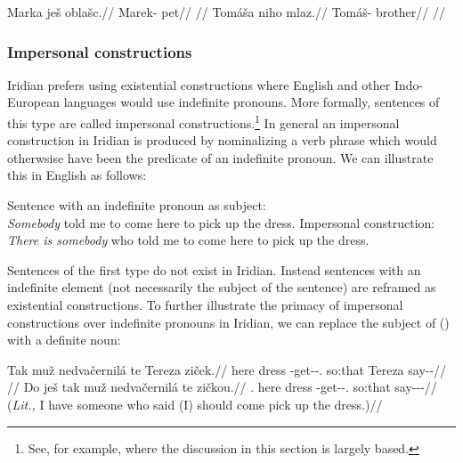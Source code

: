 \begin{multicols}{2}
\pex
  \begingl
    \gla Marka ješ oblašc.//
    \glb Marek-\Acc{} \Exst{} pet//
    \glft {}//
  \endgl
\xe
\pex
  \begingl
    \gla Tomáša niho mlaz.//
    \glb Tomáš-\Acc{} \N{}\Exst{} brother//
    \glft {}//
  \endgl
\xe
\end{multicols}

\subsubsection{Impersonal constructions}

Iridian prefers using existential constructions where English and other Indo-European languages would use indefinite pronouns. More formally, sentences of this type are called impersonal constructions.\footnote{See, for example, \textcite{lawtagalog} where the discussion in this section is largely based.} In general an impersonal construction in Iridian is produced by nominalizing a verb phrase which would otherwsise have been the predicate of an indefinite pronoun. We can illustrate this in English as follows:

\pex
\a  {}Sentence with an indefinite pronoun as subject:\\
    \emph{Somebody} told me to come here to pick up the dress.
\a  Impersonal construction:\\
    \emph{There is somebody} who told me to come here to pick up the dress.
\xe

Sentences of the first type do not exist in Iridian. Instead sentences with an indefinite element (not necessarily the subject of the sentence) are reframed as existential constructions. To further illustrate the primacy of impersonal constructions over indefinite pronouns in Iridian, we can replace the subject of () with a definite noun:

\pex
\a\begingl
    \gla Tak muž nedvačernilá te Tereza ziček.//
    \glb here dress \Caus{}-get-\Pv{}-\Subj{}.\Ipf{} so:that Tereza say-\Av{}-\Pf{}//
    \glft {}//
  \endgl
\a\begingl
    \gla Do ješ tak muž nedvačernilá te zičkou.//
    \glb \First{}\Sg{}.\Acc{} \Exst{} here dress \Caus{}-get-\Pv{}-\Subj{}.\Ipf{} so:that say-\Av{}-\Pf{}-\Nz{}//
    \glft {} (\emph{Lit.,} I have someone who said (I) should come pick up the dress.)//
  \endgl
\xe


